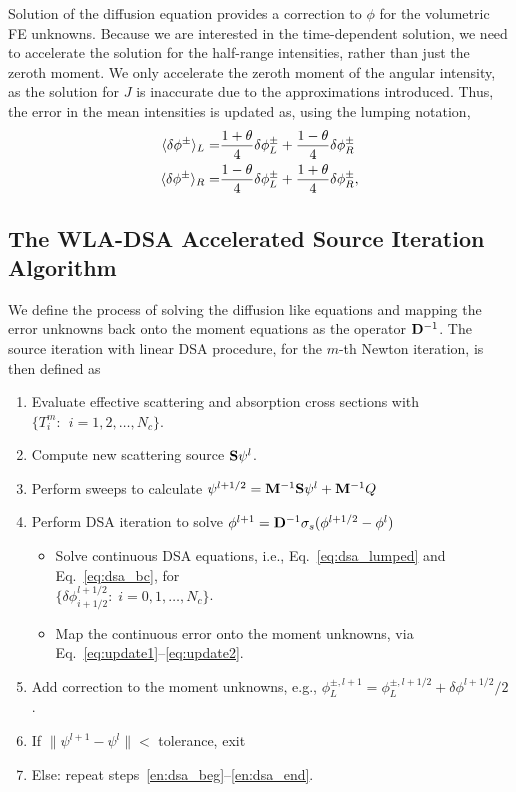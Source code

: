 Solution of the diffusion equation provides a correction to $\phi$ for the volumetric FE
unknowns. Because we are interested in the time-dependent solution, we need to accelerate the solution for the
half-range intensities, rather than just the zeroth moment. We only accelerate the zeroth
moment of the angular intensity, as the solution for $J$ is inaccurate due to the
approximations introduced.  Thus, the error in the mean intensities is updated as, using
the lumping notation,
\begin{align}
    \langle \delta \phi^{\pm} \rangle_L =&  \frac{1+\theta}{4}\delta \phi^{\pm}_{L} +
    \frac{1-\theta}{4}\delta \phi^{\pm}_{R}  \\
    \langle \delta \phi^{\pm} \rangle_R =&  \frac{1-\theta}{4}\delta \phi^{\pm}_{L} +
    \frac{1+\theta}{4}\delta \phi^{\pm}_{R}      ,
\end{align}

\subsection{The WLA-DSA Accelerated Source Iteration Algorithm}

We define the process of solving the diffusion like equations and mapping the error
unknowns back onto the moment equations as the operator $\mathbf{D}^{-1}$.
The source iteration with linear DSA procedure, for the $m$-th Newton iteration, is then defined as
\begin{enumerate}
    \item Evaluate effective scattering and absorption cross sections with
        ${\{T^m_i:\;\, i=1,2,\ldots,N_c\}}$.
    \item\label{en:dsa_beg} Compute new scattering source $\mathbf{S} \psi^l$.
    \item Perform sweeps to calculate $\psi^{l+1/2} = \mathbf{M}^{-1} \mathbf{S}\psi^{l} + \mathbf{M}^{-1} Q$
    \item Perform DSA iteration to solve $\phi^{l+1} = \mathbf{D}^{-1} \sigma_s(\phi^{l+1/2}-\phi^l)$
        \begin{itemize}
    \item Solve continuous DSA equations, i.e., Eq.~\eqref{eq:dsa_lumped} and
        Eq.~\eqref{eq:dsa_bc}, for \\${\{\delta
            \phi^{l+1/2}_{i+1/2}:\;i=0,1,\ldots,N_c\}}$.
        \item Map the continuous error onto the moment unknowns, via
            Eq.~\eqref{eq:update1}--\eqref{eq:update2}.
    \end{itemize}
    \item Add correction to the moment unknowns, e.g., $\phi_L^{\pm,l+1} = \phi_L^{\pm,l+1/2} +
        \delta \phi^{l+1/2}/2$.
    \item\label{en:dsa_end} If $\|\psi^{l+1} - \psi^{l} \| < $ tolerance, exit
    \item Else: repeat steps~\ref{en:dsa_beg}--\ref{en:dsa_end}.
\end{enumerate}

